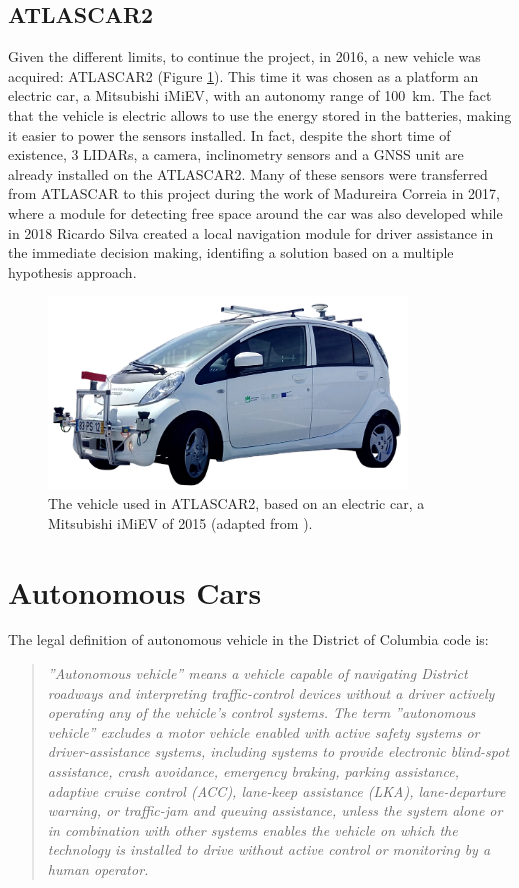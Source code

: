 \subsection{ATLASCAR2}\label{sec:ATLASCAR2}
Given the different limits, to continue the project, in 2016, a new vehicle was acquired: ATLASCAR2 (Figure \ref{fig:atlascar2}). This time it was chosen as a platform
an electric car, a Mitsubishi iMiEV, with an autonomy range of \SI{100}{km}. The fact that the vehicle is electric allows to use the energy stored in the batteries, making it easier to power the sensors installed. In fact, despite the short time of existence, 3 LIDARs, a camera, inclinometry sensors and a GNSS unit are already installed on the ATLASCAR2. Many of these sensors were transferred from ATLASCAR to this project during the work of Madureira Correia \cite{Madureira2017} in 2017, where a module for detecting free space around the car was also developed while in 2018 Ricardo Silva \cite{Ricardo:Thesis:2018} created a local navigation module for driver assistance in the immediate decision making, identifing a solution based on a multiple hypothesis approach.
\begin{figure}[!h]
	\centering
	\includegraphics[width=0.85\textwidth]{./figure/atlascar2.jpg}
	\caption{The vehicle used in ATLASCAR2, based on an electric car, a Mitsubishi iMiEV of 2015 (adapted from \cite{Ricardo:Thesis:2018}).}
	\label{fig:atlascar2}
\end{figure}

\section{Autonomous Cars}\label{sec:autonomous_examples}
The legal definition of autonomous vehicle in the District of Columbia code \cite{DColumbia} is:
\begin{quotation}
	\itshape ''Autonomous vehicle'' means a vehicle capable of navigating District roadways and interpreting traffic-control devices without a driver actively operating any of the vehicle's control systems. The term ''autonomous vehicle'' excludes a motor vehicle enabled with active safety systems or driver-assistance systems, including systems to provide electronic blind-spot assistance, crash avoidance, emergency braking, parking assistance, adaptive cruise control (ACC), lane-keep assistance (LKA), lane-departure warning, or traffic-jam and queuing assistance, unless the system alone or in combination with other systems enables the vehicle on which the technology is installed to drive without active control or monitoring by a human operator. 
\end{quotation}

